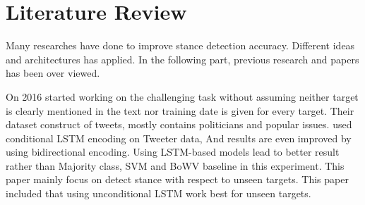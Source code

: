 \section{Literature Review}
\label{literature}
	Many researches have done to improve stance detection accuracy. Different ideas and architectures has applied. In the following part, previous research and papers has been over viewed. 
	\newline 
	
	On 2016 \cite{Augenstein2016StanceDW} started working on the challenging task without assuming neither target is clearly mentioned in the text nor training date is given for every target. Their dataset construct of tweets, mostly contains politicians and popular issues. \cite{Augenstein2016StanceDW} used conditional LSTM encoding on Tweeter data, And results are even improved by using bidirectional encoding. Using LSTM-based models lead to better result rather than Majority class, SVM and BoWV baseline in this experiment. This paper mainly focus on detect stance with respect to unseen targets. This paper included that using unconditional LSTM work best for unseen targets.
	
